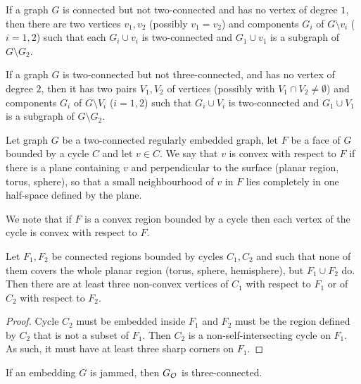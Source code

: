 \documentclass[invmat]{svjour}
\begin{document}
\begin{lemma}
\label{l:two_conn}
If a graph $G$ is connected but not two-connected  and has no vertex of
degree $1$, then there are two vertices $v_1,v_2$ (possibly $v_1=v_2$)
and components $G_i$ of $G \setminus v_i$ ($i=1,2$) such that each
$G_i\cup v_i$ is two-connected and $G_1\cup v_1$ is a subgraph of $G \setminus G_2$.
\end{lemma}

\begin{lemma}
\label{l:conn}
If a graph $G$ is two-connected but not three-connected, and has no vertex of
degree $2$,  then
it has two pairs $V_1, V_2$  of vertices (possibly with $V_1 \cap V_2
\neq \emptyset$) and components $G_i$ of $G \setminus V_i$ ($i=1,2$) such that
$G_i\cup V_i$ is two-connected and $G_1\cup V_1$ is a subgraph of $G \setminus G_2$.
\end{lemma}



\begin{definition}
\label{d:convex}
Let graph $G$ be a two-connected regularly embedded graph, let $F$
be a face of $G$ bounded by a cycle $C$ and let $v \in C$.  We say that
$v$ is convex with respect to  $F$ if there is a plane containing $v$
and perpendicular to the surface (planar region, torus, sphere), so that
a small neighbourhood of $v$ in $F$ lies completely in one half-space
defined by the plane.
\end{definition}


We note that if $F$ is a convex region bounded by a cycle then each
vertex of the cycle is convex with respect to $F$.


\begin{lemma}
\label{l:conv1}
Let $F_1, F_2$ be connected regions bounded by cycles $C_1,C_2$ and such that 
none of them covers the whole planar region (torus, sphere, hemisphere),
but $F_1\cup F_2$ do. Then
there are at least three non-convex vertices of $C_1$ with respect to  $F_1$
or of $C_2$ with respect to $F_2$.
\end{lemma}
\begin{proof}
Cycle $C_2$ must be embedded inside $F_1$ and
$F_2$ must be the region defined by $C_2$ that is not a subset of $F_1$. Then
$C_2$ is a non-self-intersecting cycle on $F_1$. As such, it must have at
least three sharp corners on $F_1$.
\end{proof}



\begin{proposition}
\label{p:jammed_three_connected}
If an embedding $G$ is jammed, then $G_{\mathcal{O}}$ is three-connected.
\end{proposition}
\end{document}
